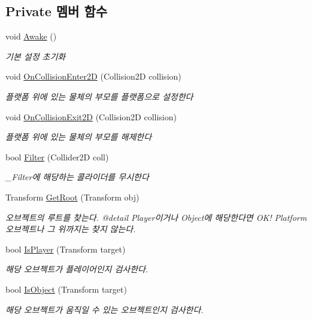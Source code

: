 \subsection*{Private 멤버 함수}
\begin{DoxyCompactItemize}
\item 
void \mbox{\hyperlink{class_platform_catcher_a85b586a2617a568e4201c3f3b3c4103f}{Awake}} ()
\begin{DoxyCompactList}\small\item\em 기본 설정 초기화 \end{DoxyCompactList}\item 
void \mbox{\hyperlink{class_platform_catcher_ac9a60991fc1368c0e63e52374e30b304}{On\+Collision\+Enter2D}} (Collision2D collision)
\begin{DoxyCompactList}\small\item\em 플랫폼 위에 있는 물체의 부모를 플랫폼으로 설정한다 \end{DoxyCompactList}\item 
void \mbox{\hyperlink{class_platform_catcher_aca1e0783636e67b995dfb75c077fc9ef}{On\+Collision\+Exit2D}} (Collision2D collision)
\begin{DoxyCompactList}\small\item\em 플랫폼 위에 있는 물체의 부모를 해제한다 \end{DoxyCompactList}\item 
bool \mbox{\hyperlink{class_platform_catcher_a3c2f5ed62367fa897f370f36e2393751}{Filter}} (Collider2D coll)
\begin{DoxyCompactList}\small\item\em \+\_\+\+Filter에 해당하는 콜라이더를 무시한다 \end{DoxyCompactList}\item 
Transform \mbox{\hyperlink{class_platform_catcher_a00c59069f3180cdeae1a2602aaf08bcc}{Get\+Root}} (Transform obj)
\begin{DoxyCompactList}\small\item\em 오브젝트의 루트를 찾는다. @detail Player이거나 Object에 해당한다면 O\+K! Platform 오브젝트나 그 위까지는 찾지 않는다. \end{DoxyCompactList}\item 
bool \mbox{\hyperlink{class_platform_catcher_a7c9f254031850ad9d4777dd7f55a9089}{Is\+Player}} (Transform target)
\begin{DoxyCompactList}\small\item\em 해당 오브젝트가 플레이어인지 검사한다. \end{DoxyCompactList}\item 
bool \mbox{\hyperlink{class_platform_catcher_af3185a9c2d8369aa09e7f4d4bde12b96}{Is\+Object}} (Transform target)
\begin{DoxyCompactList}\small\item\em 해당 오브젝트가 움직일 수 있는 오브젝트인지 검사한다. \end{DoxyCompactList}\end{DoxyCompactItemize}
